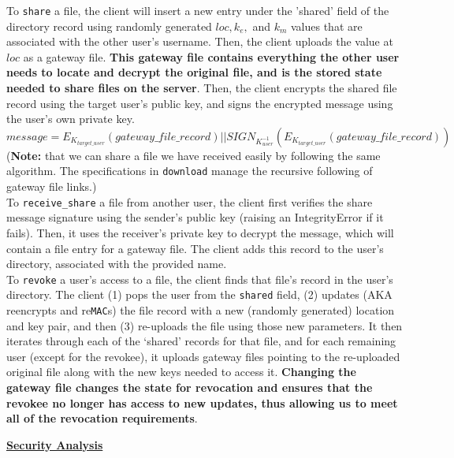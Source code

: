 \documentclass[12pt]{exam}
\begin{document}
To \texttt{share} a file, the client will insert a new entry under the 'shared' field of the directory record using randomly generated $loc, k_e,$ and $k_m$ values that are associated with the other user's username. Then, the client uploads the value at $loc$ as a gateway file. \textbf{This gateway file contains everything the other user needs to locate and decrypt the original file, and is the stored state needed to share files on the server}. Then, the client encrypts the shared file record using the target user's public key, and signs the encrypted message using the user's own private key.
 \[message = E_{K_{target\_user}}(gateway\_file\_record)||SIGN_{K_{user}^{-1}}(E_{K_{target\_user}}(gateway\_file\_record))\]
 (\textbf{Note:} that we can share a file we have received easily by following the same algorithm. The specifications in \texttt{download} manage the recursive following of gateway file links.)\\
 
 To \texttt{receive\_share} a file from another user, the client first verifies the share message signature using the sender's public key (raising an IntegrityError if it fails). Then, it uses the receiver's private key to decrypt the message, which will contain a file entry for a gateway file. The client adds this record to the user's directory, associated with the provided name.\\

To \texttt{revoke} a user's access to a file, the client finds that file's record in the user's directory. The client (1) pops the user from the \texttt{shared} field, (2) updates (AKA reencrypts and re\texttt{MAC}s) the file record with a new (randomly generated) location and key pair, and then (3) re-uploads the file using those new parameters. It then iterates through each of the `shared' records for that file, and for each remaining user (except for the revokee), it uploads gateway files pointing to the re-uploaded original file along with the new keys needed to access it. \textbf{Changing the gateway file changes the state for revocation and ensures that the revokee no longer has access to new updates, thus allowing us to meet all of the revocation requirements}.\\

\large
\begin{center} \underline{\textbf{Security Analysis}} \end{center}

\normalsize
\end{document}
